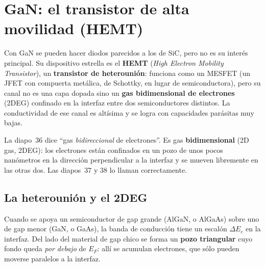 \section{GaN: el transistor de alta movilidad (HEMT)}
\label{sec:gan}

 Con GaN se pueden hacer diodos parecidos a los de SiC, pero no es su interés principal.
Su dispositivo estrella es el \textbf{HEMT} (\emph{High Electron Mobility Transistor}), un
\textbf{transistor de heterounión}: funciona como un MESFET (un JFET con compuerta metálica, de
Schottky, en lugar de semiconductora), pero su canal no es una capa dopada sino un \textbf{gas
bidimensional de electrones} (2DEG) confinado en la interfaz entre dos semiconductores distintos. La
conductividad de ese canal es altísima y se logra con capacidades parásitas muy bajas.

\begin{ojo}
La diapo~36 dice ``gas \emph{bidireccional} de electrones''. Es gas \textbf{bidimensional} (2D gas,
2DEG): los electrones están confinados en un pozo de unos pocos nanómetros en la dirección
perpendicular a la interfaz y se mueven libremente en las otras dos. Las diapos~37 y 38 lo llaman
correctamente.
\end{ojo}

\subsection{La heterounión y el 2DEG}

Cuando se apoya un semiconductor de gap grande (AlGaN, o AlGaAs) sobre uno de gap menor (GaN, o
GaAs), la banda de conducción tiene un escalón $\Delta E_c$ en la interfaz. Del lado del material de
gap chico se forma un \textbf{pozo triangular} cuyo fondo queda \emph{por debajo} de $E_F$: allí se
acumulan electrones, que sólo pueden moverse paralelos a la interfaz.

